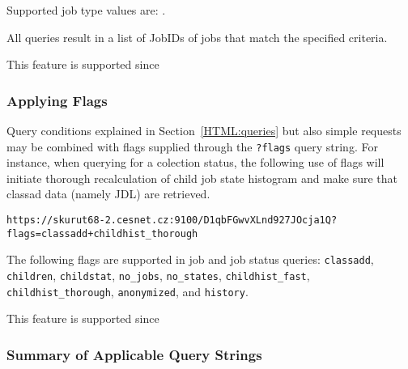 {\raggedright{}Supported job type values are: \jobtypenames.}

All queries result in a list of JobIDs of jobs that match the specified criteria.

This feature is supported since 

\subsubsection{Applying Flags}
\label{HTML:flags}

Query conditions explained in Section~\ref{HTML:queries} but also simple requests may be combined with flags supplied through the \texttt{?flags} query string. For instance, when querying for a colection status, the following use of flags will initiate thorough recalculation of child job state histogram and make sure that classad data (namely JDL) are retrieved.

\begin{verbatim}
https://skurut68-2.cesnet.cz:9100/D1qbFGwvXLnd927JOcja1Q?flags=classadd+childhist_thorough
\end{verbatim}

The following flags are supported in job and job status queries:
\texttt{classadd},
\texttt{children},
\texttt{childstat},
\texttt{no\_jobs},
\texttt{no\_states},
\texttt{childhist\_fast},
\texttt{childhist\_thorough},
\texttt{anonymized}, and
\texttt{history}.

This feature is supported since 



\subsubsection{Summary of Applicable Query Strings}
\label{HTML:querystrings}

